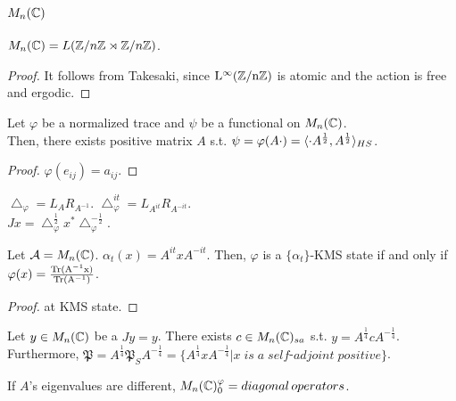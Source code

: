 \subsection{$M_n(\mathbb{C})$}

\begin{proposition}
  $M_n(\mathbb{C}) = L (\mathbb{Z}/n\mathbb{Z} \rtimes \mathbb{Z}/n\mathbb{Z})$.
\end{proposition}

\begin{proof}
  It follows from Takesaki, since $\rm{L}^\infty(\mathbb{Z}/n\mathbb{Z})$ is atomic and the action is free and ergodic.
\end{proof}


\begin{theorem}
  Let $\varphi$ be a normalized trace and $\psi$ be a functional on $M_n(\mathbb{C})$.\\
  Then, there exists positive matrix $A$ s.t. $\psi = \varphi(A\cdot) = \langle\cdot A^{\frac{1}{2}},A^{\frac{1}{2}}\rangle_{HS}$.
\end{theorem}

\begin{proof}
  $\varphi(e_{ij})=a_{ij}$.
\end{proof}

\begin{theorem}
  $\bigtriangleup_\varphi=L_AR_{A^{-1}}$. $\bigtriangleup_\varphi^{it}=L_{A^{it}}R_{A^{-it}}$. \\
  $Jx=\bigtriangleup_\varphi^{\frac{1}{2}}x^*\bigtriangleup_\varphi^{-\frac{1}{2}}$.
\end{theorem}

\begin{proposition}
  Let $\mathcal{A} = M_n(\mathbb{C})$. $\alpha_t(x) = A^{it}xA^{-it}$.
  Then, $\varphi$ is a $\{\alpha_t\}$-KMS state  if and only if $\varphi(x)= \frac{\rm{Tr}(A^{-1}x)}{\rm{Tr}(A^{-1})}$.
\end{proposition}

\begin{proof}
  at KMS state.
\end{proof}

\begin{theorem}
  Let $y \in M_n(\mathbb{C})$ be a $Jy=y$.
  There exists $c \in M_n(\mathbb{C})_{sa}$ s.t. $y = A^{\frac{1}{4}}cA^{-\frac{1}{4}}$.\\
  Furthermore, $\mathfrak{P} = A^{\frac{1}{4}}\mathfrak{P}_SA^{-\frac{1}{4}} = \{A^{\frac{1}{4}}xA^{-\frac{1}{4}} | x \; is \; a \; self$-$adjoint \; positive\}$.
\end{theorem}

\begin{theorem}
  If $A$'s eigenvalues are different, $M_n(\mathbb{C})_0^{\varphi}=diagonal \, operators$.
\end{theorem}

